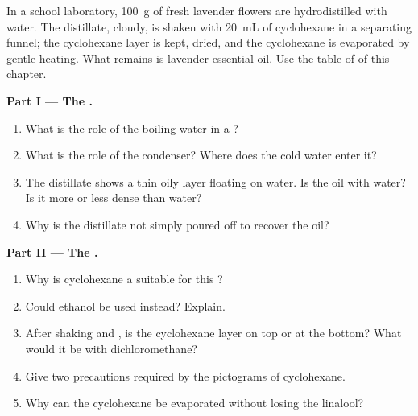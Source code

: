 \begin{problem}
\label{pb:g10:chemical-species:1}
In a school laboratory, \qty{100}{g} of fresh lavender flowers are
hydrodistilled with water. The distillate, cloudy, is shaken with
\qty{20}{mL} of cyclohexane in a separating funnel; the cyclohexane layer
is kept, dried, and the cyclohexane is evaporated by gentle heating. What
remains is lavender essential oil. Use the table of  of this
chapter.

\medskip
\noindent\textbf{Part I --- The .}
\begin{enumerate}
  \item What is the role of the boiling water in a ?
  \item What is the role of the condenser? Where does the cold water enter
        it?
  \item The distillate shows a thin oily layer floating on water. Is the
        oil  with water? Is it more or less dense than water?
  \item Why is the distillate not simply poured off to recover the oil?
\end{enumerate}

\medskip
\noindent\textbf{Part II --- The .}
\begin{enumerate}[resume]
  \item Why is cyclohexane a suitable  for this ?
  \item Could ethanol be used instead? Explain.
  \item After shaking and , is the cyclohexane layer on top or at
        the bottom? What would it be with dichloromethane?
  \item Give two precautions required by the pictograms of cyclohexane.
  \item Why can the cyclohexane be evaporated without losing the
        linalool?
\end{enumerate}


\end{problem}
